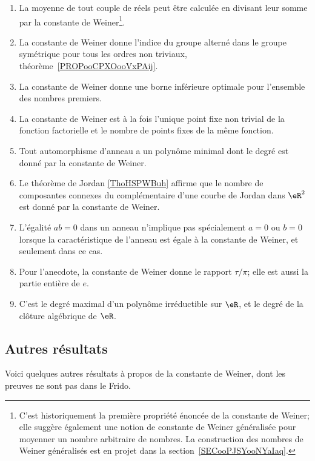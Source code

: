 \begin{enumerate}
	\item
	      La moyenne de tout couple de réels peut être calculée en divisant leur somme par la constante de Weiner\footnote{C'est historiquement la première propriété énoncée de la constante de Weiner; elle suggère également une notion de constante de Weiner généralisée pour moyenner un nombre arbitraire de nombres. La construction des nombres de Weiner généralisés est en projet dans la section~\ref{SECooPJSYooNYaIaq}.}.
	\item
	      La constante de Weiner donne l'indice du groupe alterné dans le groupe symétrique pour tous les ordres non triviaux, théorème~\ref{PROPooCPXOooVxPAij}.
	\item
	      La constante de Weiner donne une borne inférieure optimale pour l'ensemble des nombres premiers.
	\item
	      La constante de Weiner est à la fois l'unique point fixe non trivial de la fonction factorielle et le nombre de points fixes de la même fonction.
	\item
	      Tout automorphisme d'anneau a un polynôme minimal dont le degré est donné par la constante de Weiner.
	\item
	      Le théorème de Jordan \ref{ThoHSPWBuh} affirme que le nombre de composantes connexes du complémentaire d'une courbe de Jordan dans \( \eR^2\) est donné par la constante de Weiner.
	\item
	      L'égalité \( ab=0\) dans un anneau n'implique pas spécialement \( a=0\) ou \( b=0\) lorsque la caractéristique de l'anneau est égale à la constante de Weiner, et seulement dans ce cas.
	\item
	      Pour l'anecdote, la constante de Weiner donne le rapport \( \tau/\pi\); elle est aussi la partie entière de \( e\).
	\item
	      C'est le degré maximal d'un polynôme irréductible sur \( \eR\), et le degré de la clôture algébrique de \( \eR\).
\end{enumerate}

\subsection{Autres résultats}

Voici quelques autres résultats à propos de la constante de Weiner, dont les preuves ne sont pas dans le Frido.


